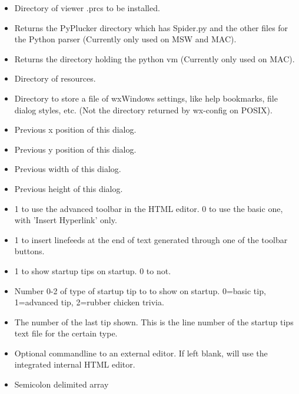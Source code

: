 \begin{helponly}
\begin{itemize}
    (gettext .mo files).
  \item {} Directory of \brandingapplicationsuitename viewer .prcs to be
     installed.
  \item {} Returns the PyPlucker directory which has Spider.py
     and the other files for the Python parser (Currently only used on MSW and MAC).
  \item {} Returns the directory holding the python vm 
     (Currently only used on MAC).
  \item {} Directory of \brandingapplicationdesktopname resources.
  \item {} Directory to store a file
     of wxWindows settings, like help bookmarks, file dialog styles, etc.
     (Not the directory returned by wx-config on POSIX). 
  \item {} Previous x position of this dialog.
  \item {} Previous y position of this dialog.
  \item {} Previous width of this dialog.
  \item {} Previous height of this dialog.
  \item {} 1 to use the advanced toolbar
    in the HTML editor. 0 to use the basic one, with 'Insert Hyperlink' only.
  \item {} 1 to insert linefeeds at the
    end of text generated through one of the toolbar buttons.
  \item {} 1 to show startup tips on startup.
    0 to not.
  \item {} Number 0-2 of type of startup tip to
    to show on startup. 0=basic tip, 1=advanced tip, 2=rubber chicken trivia.
  \item {} The number of the last
    tip shown. This is the line number of the startup tips text file for the
    certain type.
  \item {} Optional commandline to an external editor. If 
    left blank, will use the integrated internal HTML editor.
  \item {} Semicolon delimited array 

\end{itemize}
\end{helponly}
